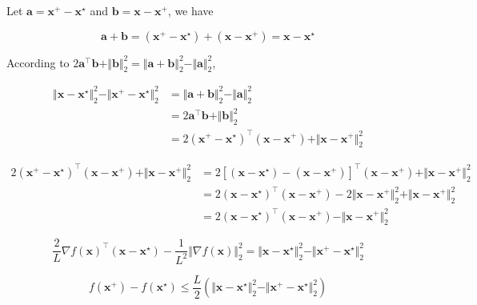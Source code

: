 \documentclass[11pt]{article}
\begin{document}
\begin{enumerate}
    Let $\mathbf{a} = \mathbf{x}^+ - \mathbf{x}^\star$ and $\mathbf{b} = \mathbf{x} - \mathbf{x}^+$, we have

    $$
    \mathbf{a} + \mathbf{b} = (\mathbf{x}^+ - \mathbf{x}^\star) + (\mathbf{x} - \mathbf{x}^+) = \mathbf{x} - \mathbf{x}^\star
    $$

    According to $2\mathbf{a}^\top \mathbf{b} + \Vert \mathbf{b}\Vert _2^2 = \Vert \mathbf{a} + \mathbf{b}\Vert _2^2 - \Vert \mathbf{a}\Vert _2^2$, 

    $$
    \begin{aligned}
        \Vert \mathbf{x} - \mathbf{x}^\star\Vert _2^2 - \Vert \mathbf{x}^+ - \mathbf{x}^\star\Vert _2^2
        &= \Vert \mathbf{a} + \mathbf{b}\Vert _2^2 - \Vert \mathbf{a}\Vert _2^2 \\
        &= 2\mathbf{a}^\top \mathbf{b} + \Vert \mathbf{b}\Vert _2^2 \\
        &= 2(\mathbf{x}^+ - \mathbf{x}^\star)^\top (\mathbf{x} - \mathbf{x}^+) + \Vert \mathbf{x} - \mathbf{x}^+\Vert _2^2
    \end{aligned}
    $$

    $$
    \begin{aligned}
        2(\mathbf{x}^+ - \mathbf{x}^\star)^\top (\mathbf{x} - \mathbf{x}^+) + \Vert \mathbf{x} - \mathbf{x}^+\Vert _2^2
        &= 2\left[(\mathbf{x} - \mathbf{x}^\star) - (\mathbf{x} - \mathbf{x}^+)\right]^\top (\mathbf{x} - \mathbf{x}^+) + \Vert \mathbf{x} - \mathbf{x}^+\Vert _2^2 \\
        &= 2(\mathbf{x} - \mathbf{x}^\star)^\top (\mathbf{x} - \mathbf{x}^+) - 2\Vert \mathbf{x} - \mathbf{x}^+\Vert _2^2 + \Vert \mathbf{x} - \mathbf{x}^+\Vert _2^2 \\
        &= 2(\mathbf{x} - \mathbf{x}^\star)^\top (\mathbf{x} - \mathbf{x}^+) - \Vert \mathbf{x} - \mathbf{x}^+\Vert _2^2
    \end{aligned}
    $$

    $$
    \frac{2}{L}\nabla f(\mathbf{x})^\top (\mathbf{x} - \mathbf{x}^\star) - \frac{1}{L^2}\Vert \nabla f(\mathbf{x})\Vert _2^2
    =
    \Vert \mathbf{x} - \mathbf{x}^\star\Vert _2^2 - \Vert \mathbf{x}^+ - \mathbf{x}^\star\Vert _2^2
    $$

    $$
    f(\mathbf{x}^+) - f(\mathbf{x}^\star)
    \le
    \frac{L}{2} \left( \Vert \mathbf{x} - \mathbf{x}^\star\Vert _2^2 - \Vert \mathbf{x}^+ - \mathbf{x}^\star\Vert _2^2 \right)
    $$
\end{enumerate}

\newpage
\end{document}
